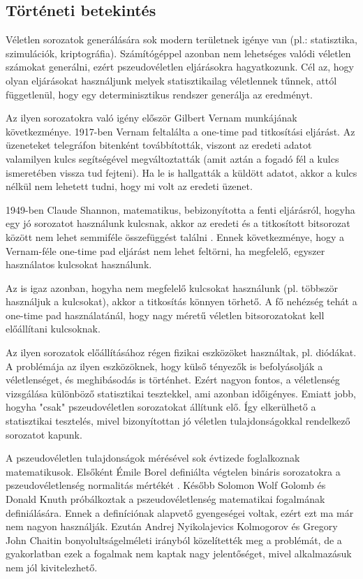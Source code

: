 \documentclass[hidelinks, 12pt]{article}
\begin{document}
	\subsection{Történeti betekintés}
	Véletlen sorozatok generálására sok modern területnek igénye van (pl.: statisztika, szimulációk, kriptográfia). Számítógéppel azonban nem lehetséges valódi véletlen számokat generálni, ezért pszeudovéletlen eljárásokra hagyatkozunk. Cél az, hogy olyan eljárásokat használjunk melyek statisztikailag véletlennek tűnnek, attól függetlenül, hogy egy determinisztikus rendszer generálja az eredményt.
	\par
	Az ilyen sorozatokra való igény először Gilbert Vernam munkájának következménye. 1917-ben Vernam feltalálta a one-time pad titkosítási eljárást. Az üzeneteket telegráfon bitenként továbbították, viszont az eredeti adatot valamilyen kulcs segítségével megváltoztatták (amit aztán a fogadó fél a kulcs ismeretében vissza tud fejteni). Ha le is hallgatták a küldött adatot, akkor a kulcs nélkül nem lehetett tudni, hogy mi volt az eredeti üzenet.
	\par
	1949-ben Claude Shannon, matematikus, bebizonyította a fenti eljárásról, hogyha egy jó sorozatot használunk kulcsnak, akkor az eredeti és a titkosított bitsorozat között nem lehet semmiféle összefüggést találni \cite{shannon}. Ennek következménye, hogy a Vernam-féle one-time pad eljárást nem lehet feltörni, ha megfelelő, egyszer használatos kulcsokat használunk.
	\par
	Az is igaz azonban, hogyha nem megfelelő kulcsokat használunk (pl. többször használjuk a kulcsokat), akkor a titkosítás könnyen törhető. A fő nehézség tehát a one-time pad használatánál, hogy nagy méretű véletlen bitsorozatokat kell előállítani kulcsoknak.
	\par
	Az ilyen sorozatok előállításához régen fizikai eszközöket használtak, pl. diódákat. A problémája az ilyen eszközöknek, hogy külső tényezők is befolyásolják a véletlenséget, és meghibásodás is történhet. Ezért nagyon fontos, a véletlenség vizsgálása különböző statisztikai tesztekkel, ami azonban időigényes. Emiatt jobb, hogyha "csak" pszeudovéletlen sorozatokat állítunk elő. Így elkerülhető a statisztikai tesztelés, mivel bizonyítottan jó véletlen tulajdonságokkal rendelkező sorozatot kapunk.
	\par
	A pszeudovéletlen tulajdonságok mérésével sok évtizede foglalkoznak matematikusok. Elsőként Émile Borel definiálta végtelen bináris sorozatokra a pszeudovéletlenség normalitás mértékét \cite{borel}. Később Solomon Wolf Golomb és Donald Knuth \cite{knuth} próbálkoztak a pszeudovéletlenség matematikai fogalmának definiálására. Ennek a definíciónak alapvető gyengeségei voltak, ezért ezt ma már nem nagyon használják. Ezután Andrej Nyikolajevics Kolmogorov \cite{kolmogorov} és Gregory John Chaitin bonyolultságelméleti irányból közelítették meg a problémát, de a gyakorlatban ezek a fogalmak nem kaptak nagy jelentőséget, mivel alkalmazásuk nem jól kivitelezhető.
\end{document}
